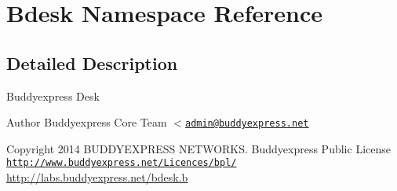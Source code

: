 \hypertarget{namespace_bdesk}{}\section{Bdesk Namespace Reference}
\label{namespace_bdesk}


\subsection{Detailed Description}
Buddyexpress Desk

\begin{DoxyAuthor}{Author}
Buddyexpress Core Team $<$\href{mailto:admin@buddyexpress.net}{\tt admin@buddyexpress.\+net} 
\end{DoxyAuthor}
\begin{DoxyCopyright}{Copyright}
2014 B\+U\+D\+D\+Y\+E\+X\+P\+R\+E\+SS N\+E\+T\+W\+O\+R\+KS.  Buddyexpress Public License \href{http://www.buddyexpress.net/Licences/bpl/}{\tt http\+://www.\+buddyexpress.\+net/\+Licences/bpl/} \hyperlink{bootstrap_8min_8js_a398bb8542498d1b14178b02b99df309b}{http\+://labs.\+buddyexpress.\+net/bdesk.\+b}
\end{DoxyCopyright}
